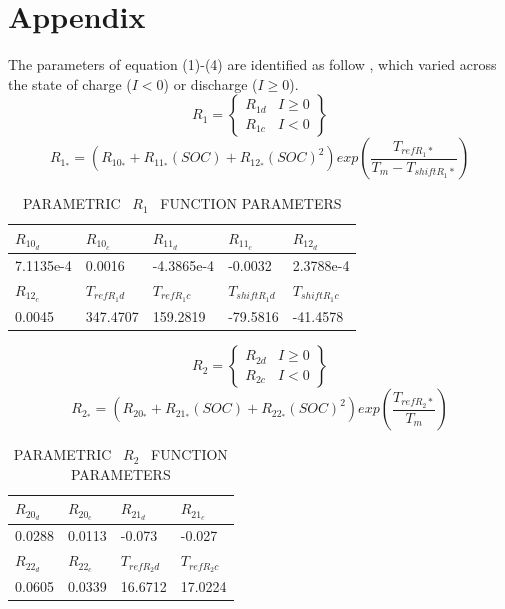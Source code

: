 \documentclass[12pt]{article}
\begin{document}
\section*{Appendix}
The parameters of equation (1)-(4) are identified as follow \cite{ref:2}, which varied across the state of charge ($I<0$) or discharge ($I\ge 0$).
\begin{equation}
R_{1} = \begin{Bmatrix}
R_{1d}&I\ge 0\\
R_{1c} &I<0
\end{Bmatrix}    
\end{equation}
\begin{equation}
R_{1_{*}}=(R_{10_{*}}+R_{11_{*}}(SOC)+R_{12_{*}}(SOC)^{2})exp\left ( \frac{T_{refR_{1}*}}{T_m-T_{shiftR_{1}*}} \right )
\end{equation}
\begin{table}[H]
	\caption{PARAMETRIC \ $R_1$ \ FUNCTION PARAMETERS}
	\vspace{-0.4cm}
	\centering
	\begin{tabular}{lllll}
		\hline
		$R_{10_{d}}$ & $R_{10_{c}}$ & $R_{11_{d}}$ & $R_{11_{c}}$ &$R_{12_{d}}$  \\
		\hline
		7.1135e-4 & 0.0016 & -4.3865e-4 & -0.0032 & 2.3788e-4 \\
		\hline
		$R_{12_{c}}$ & $T_{refR_{1}d}$& $T_{refR_{1}c}$ &$T_{shiftR_{1}d}$ & $T_{shiftR_{1}c}$\\
		\hline
		0.0045 & 347.4707 & 159.2819 & -79.5816 & -41.4578 \\
		\hline
	\end{tabular}
\end{table}
\begin{equation}
R_{2} = 
\begin{Bmatrix}
R_{2d}&I\ge 0\\
R_{2c} &I<0
\end{Bmatrix}
\end{equation}
\begin{equation}
R_{2_{*}}=(R_{20_{*}}+R_{21_{*}}(SOC)+R_{22_{*}}(SOC)^{2})exp\left ( \frac{T_{refR_{2}*}}{T_m} \right )
\end{equation}
\begin{table}[H]
	\caption{PARAMETRIC \ $R_2$ \ FUNCTION PARAMETERS}
	\vspace{-0.4cm}
	\centering
	\begin{tabular}{llll}
		\hline
		$R_{20_{d}}$ & $R_{20_{c}}$ & $R_{21_{d}}$ & $R_{21_{c}}$ \\
		\hline
		0.0288 & 0.0113 & -0.073 & -0.027  \\
		\hline
		$R_{22_{d}}$ & $R_{22_{c}}$& $T_{refR_{2}d}$& $T_{refR_{2}c}$ \\
		\hline
		0.0605 & 0.0339 & 16.6712 & 17.0224 \\
		\hline
	\end{tabular}
\end{table}
\end{document}
